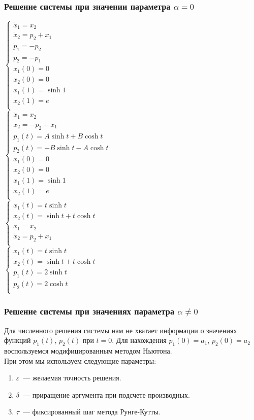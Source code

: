 \documentclass[24pt]{article}
\begin{document}
\subsubsection{Решение системы при значении параметра $\alpha = 0$}
$
\begin{cases}
\dot x_1 = x_2\\
\dot x_2 = p_2 + x_1\\
\dot p_1 = -p_2\\
\dot p_2 = -p_1\\
x_1(0) = 0\\
x_2(0) = 0\\
x_1(1) = \sinh 1\\
x_2(1) = e\\
\end{cases}
$\\
$
\begin{cases}
\dot x_1 = x_2\\
\dot x_2 = -p_2 + x_1\\
p_1(t) = A \sinh t + B \cosh t\\
p_2(t) = -B \sinh t - A \cosh t\\
x_1(0) = 0\\
x_2(0) = 0\\
x_1(1) = \sinh 1\\
x_2(1) = e\\
\end{cases}
$
\\
$
\begin{cases}
x_1(t) = t\sinh t\\
x_2(t) = \sinh t + t\cosh t\\
\dot x_1 = x_2\\
\dot x_2 = p_2 + x_1\\
\end{cases}
$
\\
$
\begin{cases}
x_1(t) = t\sinh t\\
x_2(t) = \sinh t + t\cosh t\\
p_1(t) = 2 \sinh t\\
p_2(t) = 2 \cosh t\\
\end{cases}
$
\subsubsection{Решение системы при значениях параметра $\alpha \neq 0$}
Для численного решения системы нам не хватает информации о значениях функций $p_1(t)$, $p_2(t)$ при $t = 0$.
Для нахождения $p_1 (0) = a_1$, $p_2(0) = a_2$ воспользуемся модифицированным методом Ньютона.\\
При этом мы используем следующие параметры:
\begin{enumerate}
\item
$\varepsilon$~--- желаемая точность решения.
\item
$\delta$~--- приращение аргумента при подсчете производных.
\item
$\tau$~--- фиксированный шаг метода Рунге-Кутты.
\end{enumerate}
\end{document}
